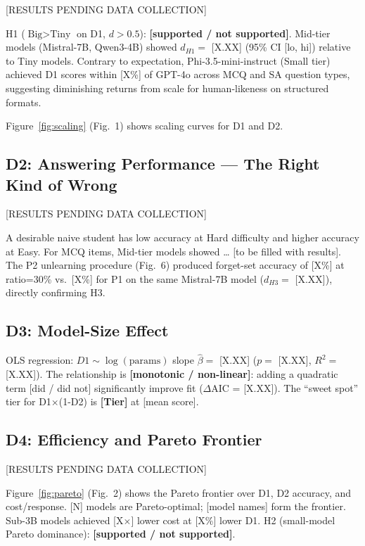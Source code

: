 \documentclass[10pt,twocolumn]{IEEEtran}
\begin{document}
[RESULTS PENDING DATA COLLECTION]

H1 ($\text{Big} > \text{Tiny}$ on D1, $d > 0.5$): \textbf{[supported / not supported]}.
Mid-tier models (Mistral-7B, Qwen3-4B) showed $d_{H1} = $ [X.XX] (95\% CI [lo, hi])
relative to Tiny models. Contrary to expectation, Phi-3.5-mini-instruct (Small tier)
achieved D1 scores within [X\%] of GPT-4o across MCQ and SA question types,
suggesting diminishing returns from scale for human-likeness on structured formats.

Figure~\ref{fig:scaling} (Fig.~1) shows scaling curves for D1 and D2.

\subsection{D2: Answering Performance — The Right Kind of Wrong}

[RESULTS PENDING DATA COLLECTION]

A desirable naive student has low accuracy at Hard difficulty and higher accuracy
at Easy. For MCQ items, Mid-tier models showed \ldots{} [to be filled with results].
The P2 unlearning procedure (Fig.~6) produced forget-set accuracy of [X\%]
at ratio=30\% vs.\ [X\%] for P1 on the same Mistral-7B model ($d_{H3} = $ [X.XX]),
directly confirming H3.

\subsection{D3: Model-Size Effect}

OLS regression: $D1 \sim \log(\text{params})$ slope $\hat{\beta} = $ [X.XX]
($p = $ [X.XX], $R^2 = $ [X.XX]). The relationship is \textbf{[monotonic /
non-linear]}: adding a quadratic term [did / did not] significantly improve
fit ($\Delta$AIC = [X.XX]). The ``sweet spot'' tier for D1$\times$(1-D2) is
\textbf{[Tier]} at [mean score].

\subsection{D4: Efficiency and Pareto Frontier}

[RESULTS PENDING DATA COLLECTION]

Figure~\ref{fig:pareto} (Fig.~2) shows the Pareto frontier over D1, D2 accuracy,
and cost/response. [N] models are Pareto-optimal; [model names] form the
frontier. Sub-3B models achieved [X$\times$] lower cost at [X\%] lower D1.
H2 (small-model Pareto dominance): \textbf{[supported / not supported]}.
\end{document}
